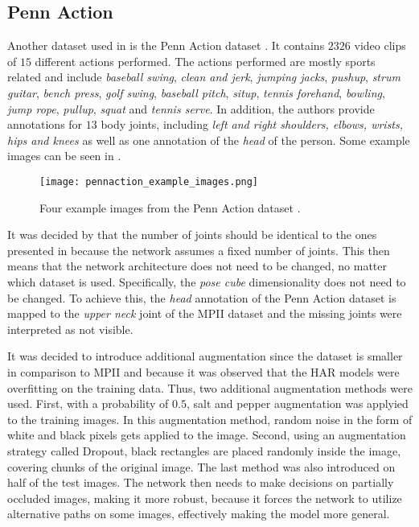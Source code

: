 \subsection{Penn Action}
\label{sec:exp-penn}

Another dataset used in \cite{luvizon_2d/3d_2018} is the Penn Action dataset \cite{zhang_actemes_2013}.
It contains $2326$ video clips of $15$ different actions performed.
The actions performed are mostly sports related and include \textit{baseball swing}, \textit{clean and jerk}, \textit{jumping jacks}, \textit{pushup}, \textit{strum guitar}, \textit{bench press}, \textit{golf swing}, \textit{baseball pitch}, \textit{situp}, \textit{tennis forehand}, \textit{bowling}, \textit{jump rope}, \textit{pullup}, \textit{squat} and \textit{tennis serve}.
In addition, the authors provide annotations for $13$ body joints,
including \textit{left and right shoulders, elbows, wrists, hips and knees} as well as one annotation of the \textit{head} of the person.
Some example images can be seen in . 

\begin{figure}[htb!]
    \centering
    \texttt{[image: pennaction\_example\_images.png]}
    \caption{Four example images from the Penn Action dataset \cite{zhang_actemes_2013}. }
    \label{fig:pennaction_example_images}
\end{figure}

It was decided by \cite{luvizon_2d/3d_2018} that the number of joints should be identical to the ones presented in \cite{andriluka_2d_2014}  because the network assumes a fixed number of joints.
This then means that the network architecture does not need to be changed, no matter which dataset is used.
Specifically, the \textit{pose cube} dimensionality does not need to be changed.
To achieve this, the \textit{head} annotation of the Penn Action dataset is mapped to the \textit{upper neck} joint of the MPII dataset and the missing joints were interpreted as not visible.

It was decided to introduce additional augmentation since the dataset is smaller in comparison to MPII and because it was observed that the HAR models were overfitting on the training data.
Thus, two additional augmentation methods were used.
First, with a probability of $0.5$, salt and pepper augmentation was applyied to the training images.
In this augmentation method, random noise in the form of white and black pixels gets applied to the image.
Second, using an augmentation strategy called Dropout, black rectangles are placed randomly inside the image, covering chunks of the original image.
The last method was also introduced on half of the test images.
The network then needs to make decisions on partially occluded images, making it more robust, because it forces the network to utilize alternative paths on some images, effectively making the model more general.

